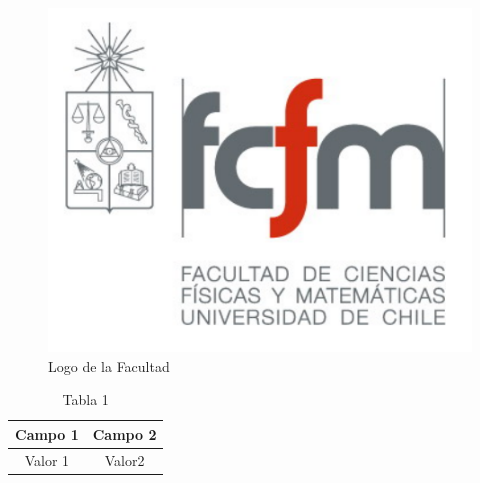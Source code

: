 \begin{conclusion}
\lipsum[130-132]
\begin{figure}[!h]
\centering
\includegraphics[scale=.2]{fcfm}
\caption{Logo de la Facultad}
\label{logofcfm}
\end{figure}
\lipsum[133-134]
\begin{table}[!h]
\centering
\begin{tabular}{|c||c|}
\hline
Campo 1& Campo 2\\\hline
Valor 1& Valor2\\\hline
\end{tabular}
\caption{Tabla 1}
\label{tabla:1}
\end{table}
\lipsum[135]
\end{conclusion}